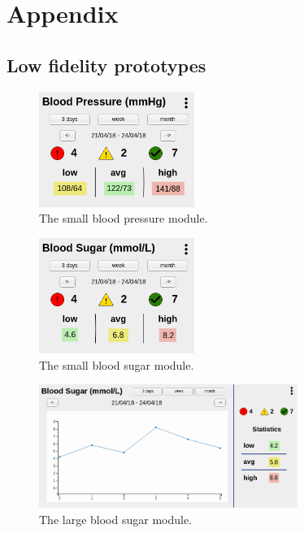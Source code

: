 \newpage
\appendix

\section{Appendix}

\subsection{Low fidelity prototypes} \label{app_low_fidelity}

\begin{figure}[!htb]
    \centering
    \includegraphics[width=0.45\textwidth]{chapters/3_design/mockups/bp_small}
    \caption{The small blood pressure module.}\label{fig:bp_small}
\end{figure}

\begin{figure}[!htb]
    \centering
    \includegraphics[width=0.45\textwidth]{chapters/3_design/mockups/bs_small}
    \caption{The small blood sugar module.}\label{fig:bs_small}
\end{figure}

\begin{figure}[!htb]
    \centering
    \includegraphics[width=0.75\textwidth]{chapters/3_design/mockups/bs_large}
    \caption{The large blood sugar module.}\label{fig:bs_large}
\end{figure}

